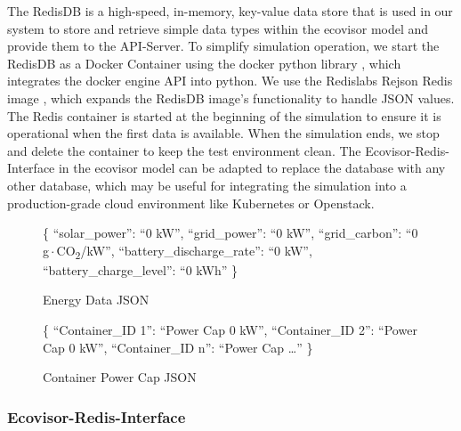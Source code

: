 The RedisDB is a high-speed, in-memory, key-value data store that is used in our
system to store and retrieve simple data types within the ecovisor model and
provide them to the API-Server. To simplify simulation operation, we start the
RedisDB as a Docker Container using the docker python library
\cite{docker_python}, which integrates the docker engine API into python. We use
the Redislabs Rejson Redis image \cite{RedisJSON}, which expands the RedisDB
image's functionality to handle JSON values. The Redis container is started at
the beginning of the simulation to ensure it is operational when the first data
is available. When the simulation ends, we stop and delete the container to keep
the test environment clean. The Ecovisor-Redis-Interface in the ecovisor model
can be adapted to replace the database with any other database, which may be
useful for integrating the simulation into a production-grade cloud environment
like Kubernetes or Openstack.

\begin{figure}
    \removelatexerror
    \begin{algorithm}[H]
        \caption{Energy Data JSON}
        \label{alg:energy_JSON}
        \{\;
        \Indp
            \enquote{solar\_power}: \enquote{0 kW},\;
            \enquote{grid\_power}: \enquote{0 kW},\;
            \enquote{grid\_carbon}: \enquote{0 g\,$\cdot$\,CO\textsubscript{2}/kW},\;
            \enquote{battery\_discharge\_rate}: \enquote{0 kW},\;
            \enquote{battery\_charge\_level}: \enquote{0 kWh}\;
        \Indm
        \}
        \vspace{3mm}
    \end{algorithm}
\end{figure}

\begin{figure}
    \removelatexerror
    \begin{algorithm}[H]
        \caption{Container Power Cap JSON}
        \label{alg:container_JSON}
        \{\;
        \Indp
            \enquote{Container\_ID 1}: \enquote{Power Cap 0 kW},\;
            \enquote{Container\_ID 2}: \enquote{Power Cap 0 kW},\;
            \enquote{Container\_ID n}: \enquote{Power Cap \dots}\;
        \Indm
        \}
        \vspace{3mm}
    \end{algorithm}
\end{figure}

\subsubsection{Ecovisor-Redis-Interface}

